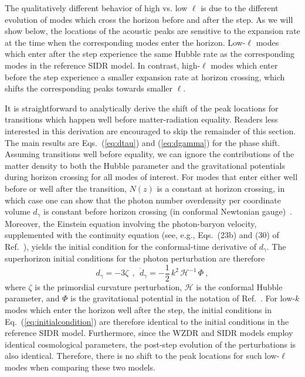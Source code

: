 \documentclass[aps,prd,twocolumn,nofootinbib,superscriptaddress]{revtex4}
\newcommand{\Eq}[1]{Eq.~(\ref{eq:#1})}
\newcommand{\be}{\begin{equation}}
\newcommand{\ee}{\end{equation}}
\begin{document}
The qualitatively different behavior of high vs. low $\ell$ is due to the different evolution of modes which cross the horizon before and after the step. As we will show below, the locations of the acoustic peaks are sensitive to the expansion rate at the time when the corresponding modes enter the horizon. Low-$\ell$ modes which enter after the step experience the same Hubble rate as the corresponding modes in the reference SIDR model. In contrast, high-$\ell$ modes which enter before the step experience a smaller expansion rate at horizon crossing, which shifts the corresponding peaks towards smaller $\ell$.

It is straightforward to analytically derive the shift of the peak locations for transitions which happen well before matter-radiation equality. Readers less interested in this derivation are encouraged to skip the remainder of this section. The main results are Eqs.~(\ref{eq:dtau}) and (\ref{eq:dgamma}) for the phase shift. Assuming transitions well before equality, we can ignore the contributions of the matter density to both the Hubble parameter and the gravitational potentials during horizon crossing for all modes of interest. For modes that enter either well before or well after the transition, $N(z)$ is a constant at horizon crossing, in which case one can show that the photon number overdensity per coordinate volume $d_\gamma$ is constant before horizon crossing (in conformal Newtonian gauge)~\cite{Bashinsky:2003tk,Baumann:2015rya}. Moreover, the Einstein equation involving the photon-baryon velocity, supplemented with the continuity equation (see, e.g., Eqs.~(23b) and (30) of Ref.~\cite{Ma:1995ey}), yields the initial condition for the conformal-time derivative of $d_\gamma$. The superhorizon initial conditions for the photon perturbation are therefore
\be
\label{eq:initialcondition}
 d_\gamma = -3 \zeta
 ~~,~~ \dot{d}_\gamma = -\frac{1}{2} \, k^2 \, \mathcal{H}^{-1} \, \Phi
 ~,
\ee
where $\zeta$ is the primordial curvature perturbation, $\mathcal{H}$ is the conformal Hubble parameter, and $\Phi$ is the gravitational potential in the notation of Ref.~\cite{Baumann:2015rya}. For low-$k$ modes which enter the horizon well after the step, the initial conditions in \Eq{initialcondition} are therefore identical to the initial conditions in the reference SIDR model. Furthermore, since the WZDR and SIDR models employ identical cosmological parameters, the post-step evolution of the perturbations is also identical. Therefore, there is no shift to the peak locations for such low-$\ell$ modes when comparing these two models. 
\end{document}
